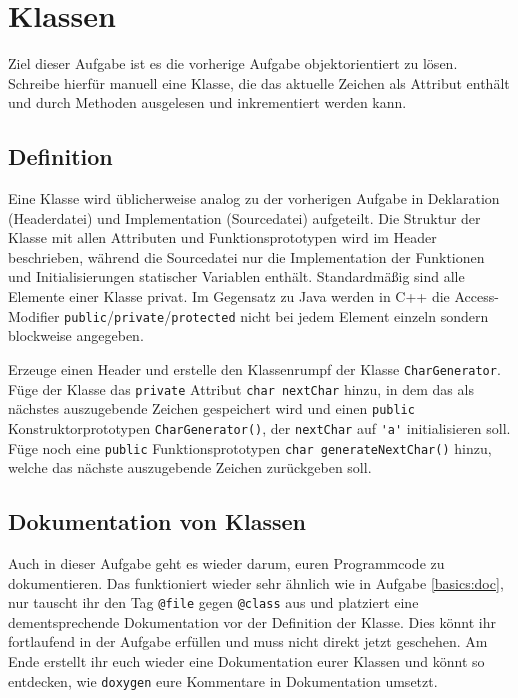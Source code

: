 \section{\ExercisePrefixBasics Klassen}
Ziel dieser Aufgabe ist es die vorherige Aufgabe objektorientiert zu lösen. Schreibe hierfür manuell eine Klasse, die das aktuelle Zeichen als Attribut enthält und durch Methoden ausgelesen und inkrementiert werden kann.


\subsection{Definition}
Eine Klasse wird üblicherweise analog zu der vorherigen Aufgabe in Deklaration (Headerdatei) und Implementation (Sourcedatei) aufgeteilt.
Die Struktur der Klasse mit allen Attributen und Funktionsprototypen wird im Header beschrieben, während die Sourcedatei nur die Implementation der Funktionen und Initialisierungen statischer Variablen enthält.
Standardmäßig sind alle Elemente einer Klasse privat.
Im Gegensatz zu Java werden in C++ die Access-Modifier \lstinline{public}/\lstinline{private}/\lstinline{protected} nicht bei jedem Element einzeln sondern blockweise angegeben.

  

Erzeuge einen Header  und erstelle den Klassenrumpf der Klasse \lstinline{CharGenerator}.
Füge der Klasse das \lstinline{private} Attribut \lstinline{char nextChar} hinzu, in dem das als nächstes auszugebende Zeichen gespeichert wird und einen \lstinline{public} Konstruktorprototypen \lstinline{CharGenerator()}, der \lstinline{nextChar} auf \lstinline{'a'} initialisieren soll.
Füge noch eine \lstinline{public} Funktionsprototypen \lstinline{char generateNextChar()} hinzu, welche das nächste auszugebende Zeichen zurückgeben soll.



\subsection{Dokumentation von Klassen}
Auch in dieser Aufgabe geht es wieder darum, euren Programmcode zu dokumentieren.
Das funktioniert wieder sehr ähnlich wie in Aufgabe \ref{basics:doc}, nur tauscht ihr den Tag \lstinline{@file} gegen \lstinline{@class} aus und platziert eine dementsprechende Dokumentation vor der Definition der Klasse.
Dies könnt ihr fortlaufend in der Aufgabe erfüllen und muss nicht direkt jetzt geschehen.
Am Ende erstellt ihr euch wieder eine Dokumentation eurer Klassen und könnt so entdecken, wie \texttt{doxygen} eure Kommentare in Dokumentation umsetzt.

